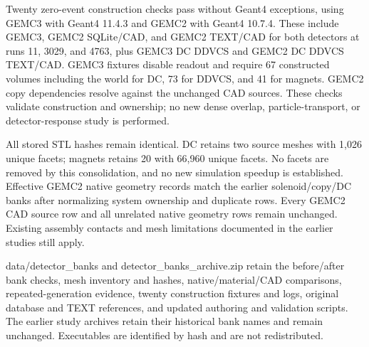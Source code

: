 Twenty zero-event construction checks pass without Geant4 exceptions, using GEMC3 with Geant4 11.4.3 and GEMC2
with Geant4 10.7.4. These include GEMC3, GEMC2 SQLite/CAD, and GEMC2 TEXT/CAD for both detectors at runs 11,
3029, and 4763, plus GEMC3 DC DDVCS and GEMC2 DC DDVCS TEXT/CAD. GEMC3 fixtures disable readout and require 67
constructed volumes including the world for DC, 73 for DDVCS, and 41 for magnets. GEMC2 copy dependencies
resolve against the unchanged CAD sources. These checks validate construction and ownership; no new dense
overlap, particle-transport, or detector-response study is performed.

All stored STL hashes remain identical. DC retains two source meshes with 1,026 unique facets; magnets retains
20 with 66,960 unique facets. No facets are removed by this consolidation, and no new simulation speedup is
established. Effective GEMC2 native geometry records match the earlier solenoid/copy/DC banks after
normalizing system ownership and duplicate rows. Every GEMC2 CAD source row and all unrelated native geometry
rows remain unchanged. Existing assembly contacts and mesh limitations documented in the earlier studies still
apply.

data/detector\_banks and detector\_banks\_archive.zip retain the before/after bank checks, mesh inventory and
hashes, native/material/CAD comparisons, repeated-generation evidence, twenty construction fixtures and logs,
original database and TEXT references, and updated authoring and validation scripts. The earlier study
archives retain their historical bank names and remain unchanged. Executables are identified by hash and are
not redistributed.
